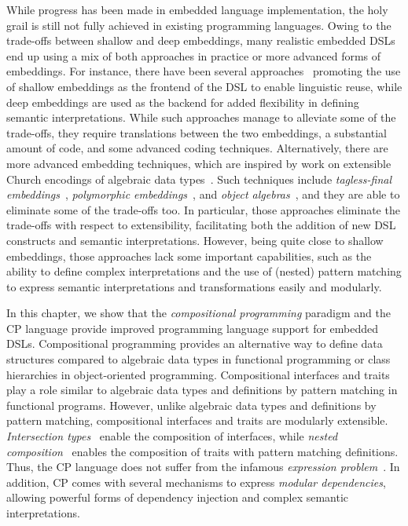 While progress has been made in embedded language implementation, the holy grail
is still not fully achieved in existing programming languages. Owing to the
trade-offs between shallow and deep embeddings, many realistic embedded DSLs end
up using a mix of both approaches in practice or more advanced forms of
embeddings. For instance, there have been several
approaches~\citep{rompf2012scala,svenningsson2015combining,jovanovic2014yinyang}
promoting the use of shallow embeddings as the frontend of the DSL to enable
linguistic reuse, while deep embeddings are used as the backend for added
flexibility in defining semantic interpretations. While such approaches manage
to alleviate some of the trade-offs, they require translations between the two
embeddings, a substantial amount of code, and some advanced coding techniques.
Alternatively, there are more advanced embedding techniques, which are inspired
by work on extensible Church encodings of algebraic data
types~\citep{hinze2006generics,oliveira2006extensible,oliveira2009modular}. Such
techniques include \emph{tagless-final
embeddings}~\citep{carette2009finally,kiselyov2010typed}, \emph{polymorphic
embeddings}~\citep{hofer2008polymorphic}, and \emph{object
algebras}~\citep{oliveira2012extensibility}, and they are able to eliminate some
of the trade-offs too. In particular, those approaches eliminate the trade-offs
with respect to extensibility, facilitating both the addition of new DSL
constructs and semantic interpretations. However, being quite close to shallow
embeddings, those approaches lack some important capabilities, such as the
ability to define complex interpretations and the use of (nested) pattern
matching to express semantic interpretations and transformations easily and
modularly.

In this chapter, we show that the \emph{compositional programming} paradigm and
the CP language provide improved programming language support for embedded DSLs.
Compositional programming provides an alternative way to define data structures
compared to algebraic data types in functional programming or class hierarchies
in object-oriented programming. Compositional interfaces and traits play a role
similar to algebraic data types and definitions by pattern matching in
functional programs. However, unlike algebraic data types and definitions by
pattern matching, compositional interfaces and traits are modularly extensible.
\emph{Intersection types}~\citep{oliveira2016disjoint} enable the composition of
interfaces, while \emph{nested composition}~\citep{bi2018essence} enables the
composition of traits with pattern matching definitions.  Thus, the CP language
does not suffer from the infamous \emph{expression
problem}~\citep{wadler1998expression}. In addition, CP comes with several
mechanisms to express \emph{modular dependencies}, allowing powerful forms of
dependency injection and complex semantic interpretations.

